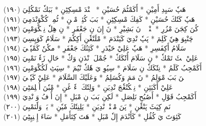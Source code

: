 \documentclass[a4paper, 10pt]{report}
\begin{document}
\begin{center}
\textarabic{(١٩٠) \textcolor{mygreen}{هَپٗ سَيِدِ أَمِيْنِ  * أَكَمْٹُمَ حُسَيْنِ  * إٖنٖنْدَ مْسِكِٹِنِ  * بَبَكٗ نَمْكُلِيَ }} 
\\[5mm] 

\textarabic{(١٩١) \textcolor{mygreen}{هَپٗ كَتٗكَ حُسَيْنِ  * كَفِكَ مْسِكِٹِنِ  * بَبَ كُئِيٖ مْڠٖنِ  * ٹُمِوٖ كُكْوَنْدَمِيَ }} 
\\[5mm] 

\textarabic{(١٩٢) \textcolor{mygreen}{كُنَ كِجَنَ مْزُرِ  * چٖنْدٖمٖنٖ نَ بَشِيْرِ  * نَ إِنَ نِ جَعْفَرِ  * نِ هِلٗ نِمٖكْوَمْبِيَ }} 
\\[5mm] 

\textarabic{(١٩٣) \textcolor{mygreen}{چَنْبِوَ هِيٗ كَلِمَ  * پَپٗ نْدِيَ كَيَنْدَمَ  * مْلَنْڠٗنِ أَكِكٗمَ  * سَلَامُ كَوَپِسِيَ }} 
\\[5mm] 

\textarabic{(١٩٤) \textcolor{mygreen}{سَلَامُ أَكِفَسِرِ  * هَپٗ عَلِيْ حَيْدَرِ  * كَئِنُكَ جَعْفَرِ  * مكٗنٗ كَمْپٗكٖيَ }} 
\\[5mm] 

\textarabic{(١٩٥) \textcolor{mygreen}{عَلِيْ كٖٹَ تَمْكٗ  * نِ سَلَامَ أُتٗكَكٗ  * جُمْلَ وٖنْدَنِ وَكٗ  * حَالِ زَءٗ نَمْبِيَ }} 
\\[5mm] 

\textarabic{(١٩٦) \textcolor{mygreen}{أَكَمْجِبُ كَلَمُ  * نِتٗكَكٗ نِ سَلَامَ  * سِيُوِ يَ هٗكٗ نْيُمَ  * سِپَٹِ لَكُكْوَمْبِيَ }} 
\\[5mm] 

\textarabic{(١٩٧) \textcolor{mygreen}{تٖنَ بَبَ مْوَلِمُ  * نَ مَمَ وَكُسَلِمُ  * وَعَلَيْكَ السَّلَامَ  * عَلِيْ كَپٗكٖيَ }} 
\\[5mm] 

\textarabic{(١٩٨) \textcolor{mygreen}{عَلِيْ أَكَبَئِنِ  * نِمٖكُنْڠٗجَ نْدِيَنِ  * وَلِتٗكَ زٖءٗ ڠَنِ  * مْبٗنَ أُمٖلِمَٹِيَ }} 
\\[5mm] 

\textarabic{(١٩٩) \textcolor{mygreen}{أَكَمْجِبُ قَوْلِ  * أَصُبُحِ نَلِصَلِ  * لَكِنِ بَبَ نِ مْبَلِ  * إِنَ أُرٖفُ وَ نْدِيَ }} 
\\[5mm] 

\textarabic{(٢٠٠) \textcolor{mygreen}{نَمِ كِپَٹَ پَنْڠٗنِ  * پَنَ مْٹٖنْدٖ نْدِيَنِ  * يَلِنِتٗكَ مٗيٗنِ  * يَلٖ وَلٗنَمْبِيَ }} 
\\[5mm] 

\textarabic{(٢٠١) \textcolor{mygreen}{كَئِوَتَ يَ كُڤُلِ  * كَأَنْدَمَ إِلٗ مْبَلِ  * هَتَ كِتَأَمَلِ  * سَاءَ إِمٖنِپِٹِيَ }} 
\\[5mm] 


\end{center}
\end{document}
